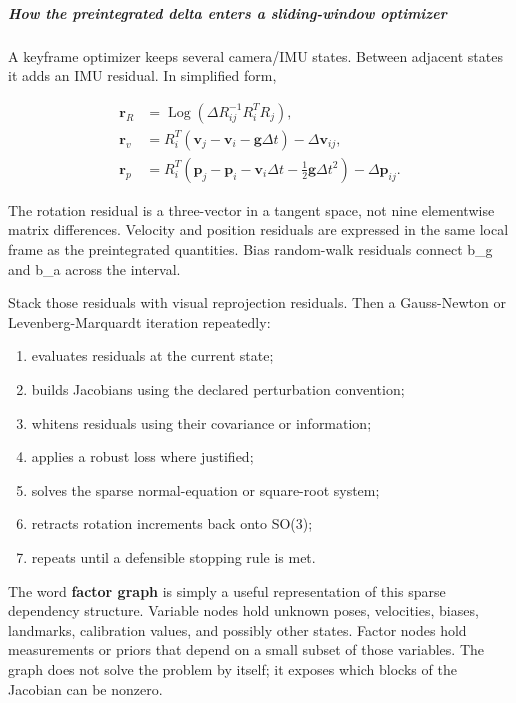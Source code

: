 \subparagraph{How the preintegrated delta enters a sliding-window optimizer}\label{04-visual-computing-ii-ch035-how-the-preintegrated-delta-enters-a-sliding-window-optimizer}

A keyframe optimizer keeps several camera/IMU states. Between adjacent states it adds an IMU residual. In simplified form,

\[
\begin{aligned}
\mathbf r_R &= \operatorname{Log}(\Delta R_{ij}^{-1}R_i^TR_j),\\
\mathbf r_v &= R_i^T(\mathbf v_j-\mathbf v_i-\mathbf g\Delta t)-\Delta\mathbf v_{ij},\\
\mathbf r_p &= R_i^T(\mathbf p_j-\mathbf p_i-\mathbf v_i\Delta t-\tfrac12\mathbf g\Delta t^2)-\Delta\mathbf p_{ij}.
\end{aligned}
\]

The rotation residual is a three-vector in a tangent space, not nine elementwise matrix differences. Velocity and position residuals are expressed in the same local frame as the preintegrated quantities. Bias random-walk residuals connect b\_g and b\_a across the interval.

Stack those residuals with visual reprojection residuals. Then a Gauss-Newton or Levenberg-Marquardt iteration repeatedly:

\begin{enumerate}
\def\labelenumi{\arabic{enumi}.}
\tightlist
\item
  evaluates residuals at the current state;
\item
  builds Jacobians using the declared perturbation convention;
\item
  whitens residuals using their covariance or information;
\item
  applies a robust loss where justified;
\item
  solves the sparse normal-equation or square-root system;
\item
  retracts rotation increments back onto SO(3);
\item
  repeats until a defensible stopping rule is met.
\end{enumerate}

The word \textbf{factor graph} is simply a useful representation of this sparse dependency structure. Variable nodes hold unknown poses, velocities, biases, landmarks, calibration values, and possibly other states. Factor nodes hold measurements or priors that depend on a small subset of those variables. The graph does not solve the problem by itself; it exposes which blocks of the Jacobian can be nonzero.


